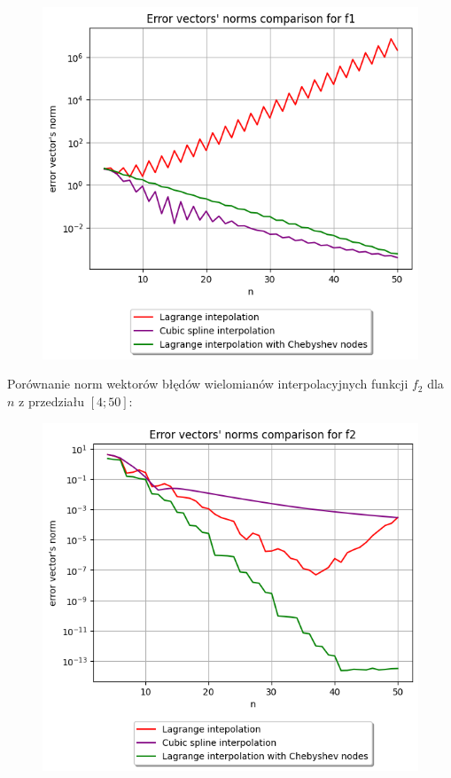 \documentclass{article}
\begin{document}
\begin{figure}[H]
  \includegraphics[width=\linewidth]{figures/errors_1.png}
\end{figure}
\newpage
Porównanie norm wektorów błędów wielomianów interpolacyjnych funkcji $f_2$ dla
 $n$ z przedziału $[4;50]$: \\

\begin{figure}[H]
  \includegraphics[width=\linewidth]{figures/errors_2.png}
\end{figure}
\end{document}
